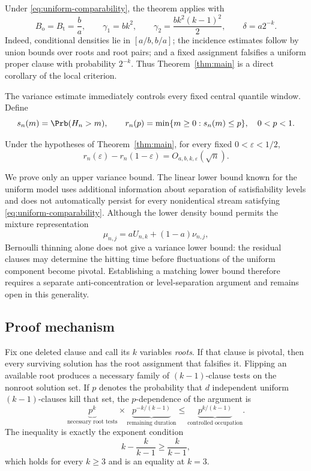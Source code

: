 Under \eqref{eq:uniform-comparability}, the theorem applies with
\begin{equation}\label{eq:local-parameters}
 B_{\mathrm{o}}=B_{\mathrm{t}}=\frac ba,
 \qquad \gamma_1=bk^2,
 \qquad \gamma_2=\frac{bk^2(k-1)^2}{2},
 \qquad \delta=a2^{-k}.
\end{equation}
Indeed, conditional densities lie in $[a/b,b/a]$; the incidence estimates
follow by union bounds over roots and root pairs; and a fixed assignment
falsifies a uniform proper clause with probability $2^{-k}$.  Thus
Theorem~\ref{thm:main} is a direct corollary of the local criterion.

The variance estimate immediately controls every fixed central quantile
window.  Define
\[
    s_n(m)=\Prb(H_n>m),
    \qquad
    r_n(p)=\min\{m\ge0:s_n(m)\le p\},
    \quad 0<p<1.
\]

\begin{corollary}
\label{cor:central-window}
Under the hypotheses of Theorem~\ref{thm:main}, for every fixed
$0<\varepsilon<1/2$,
\[
    r_n(\varepsilon)-r_n(1-\varepsilon)
    =O_{a,b,k,\varepsilon}(\sqrt n).
\]
\end{corollary}

We prove only an upper variance bound.  The linear lower bound known for the
uniform model uses additional information about separation of satisfiability
levels and does not automatically persist for every nonidentical stream
satisfying \eqref{eq:uniform-comparability}.  Although the lower density bound
permits the mixture representation
\[
 \mu_{n,j}=aU_{n,k}+(1-a)\nu_{n,j},
\]
Bernoulli thinning alone does not give a variance lower bound: the residual
clauses may determine the hitting time before fluctuations of the uniform
component become pivotal.  Establishing a matching lower bound therefore
requires a separate anti-concentration or level-separation argument and
remains open in this generality.

\subsection{Proof mechanism}

Fix one deleted clause and call its $k$ variables \emph{roots}.  If that
clause is pivotal, then every surviving solution has the root assignment
that falsifies it.  Flipping an available root produces a necessary family
of $(k-1)$-clause tests on the nonroot solution set.  If $p$ denotes the
probability that $d$ independent uniform $(k-1)$-clauses kill that set, the
$p$-dependence of the argument is
\[
    \underbrace{p^k}_{\text{necessary root tests}}
    \times
    \underbrace{p^{-k/(k-1)}}_{\text{remaining duration}}
    \le
    \underbrace{p^{k/(k-1)}}_{\text{controlled occupation}}.
\]
The inequality is exactly the exponent condition
\[
    k-\frac{k}{k-1}\ge \frac{k}{k-1},
\]
which holds for every $k\ge3$ and is an equality at $k=3$.

